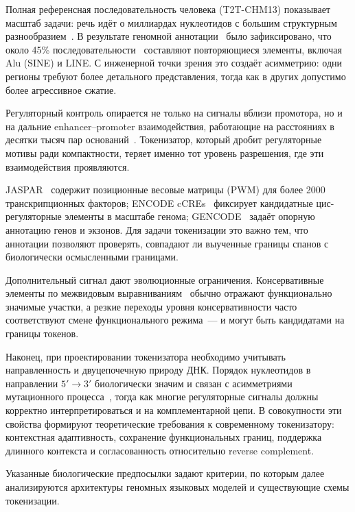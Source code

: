 Полная референсная последовательность человека (T2T-CHM13) показывает
масштаб задачи: речь идёт о миллиардах нуклеотидов с большим
структурным разнообразием~\cite{nurgalievT2TCHm13CompleteHuman2022}.
В результате геномной аннотации~\cite{landerInitialSequencingAnalysis2001}
было зафиксировано, что около 45\% последовательности~ составляют
повторяющиеся элементы, включая Alu (SINE) и LINE.
С инженерной точки зрения это создаёт асимметрию: одни регионы требуют
более детального представления, тогда как в других допустимо более
агрессивное сжатие.

Регуляторный контроль опирается не только на сигналы вблизи промотора, но
и на дальние enhancer--promoter взаимодействия, работающие на расстояниях
в десятки тысяч пар оснований~\cite{schoenfelderLongrangeEnhancerPromoter2019}.
Токенизатор, который дробит регуляторные мотивы ради компактности, теряет
именно тот уровень разрешения, где эти взаимодействия проявляются.

JASPAR~\cite{rauluseviciuteJASPAR2024} содержит позиционные весовые матрицы
(PWM) для более 2000 транскрипционных факторов; ENCODE
cCREs~\cite{encodeExpandedRegistry2024} фиксирует кандидатные цис-регуляторные
элементы в масштабе генома; GENCODE~\cite{frankishGENCODE2019} задаёт опорную
аннотацию генов и экзонов. Для задачи токенизации это важно тем, что аннотации
позволяют проверять, совпадают ли выученные границы спанов с биологически
осмысленными границами.

Дополнительный сигнал дают эволюционные ограничения. Консервативные
элементы по межвидовым
выравниваниям~\cite{siepelEvolutionarilyConservedElements2005}
обычно отражают функционально значимые участки, а резкие переходы уровня
консервативности часто соответствуют смене функционального режима~---
и могут быть кандидатами на границы токенов.

Наконец, при проектировании токенизатора необходимо учитывать
направленность и двуцепочечную природу ДНК. Порядок нуклеотидов в
направлении $5'\to 3'$ биологически значим и связан с асимметриями
мутационного процесса~\cite{rosenbergPatternsTransitionalMutation2003},
тогда как многие регуляторные сигналы должны корректно интерпретироваться
и на комплементарной цепи. В совокупности эти свойства формируют
теоретические требования к современному токенизатору: контекстная
адаптивность, сохранение функциональных границ, поддержка длинного
контекста и согласованность относительно reverse complement.

Указанные биологические предпосылки задают критерии, по которым далее
анализируются архитектуры геномных языковых моделей и существующие
схемы токенизации.

